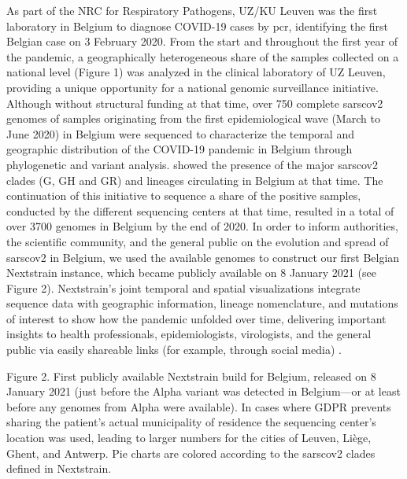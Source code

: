As part of the NRC for Respiratory Pathogens, UZ/KU Leuven was the first laboratory in Belgium to diagnose COVID-19 cases by \gls{pcr}, identifying the first Belgian case on 3 February 2020.
From the start and throughout the first year of the pandemic, a geographically heterogeneous share of the samples collected on a national level (Figure 1) was analyzed in the clinical laboratory of UZ Leuven, providing a unique opportunity for a national genomic surveillance initiative.
Although without structural funding at that time, over 750 complete \gls{sarscov2} genomes of samples originating from the first epidemiological wave (March to June 2020) in Belgium were sequenced to characterize the temporal and geographic distribution of the COVID-19 pandemic in Belgium through phylogenetic and variant analysis.
\citet{wawina-bokalanga2021genetic} showed the presence of the major \gls{sarscov2} clades (G, GH and GR) and lineages circulating in Belgium at that time.
The continuation of this initiative to sequence a share of the positive samples, conducted by the different sequencing centers at that time, resulted in a total of over 3700 genomes in Belgium by the end of 2020.
In order to inform authorities, the scientific community, and the general public on the evolution and spread of \gls{sarscov2} in Belgium, we used the available genomes to construct our first Belgian Nextstrain instance, which became publicly available on 8 January 2021 (see Figure 2).
Nextstrain's joint temporal and spatial visualizations integrate sequence data with geographic information, lineage nomenclature, and mutations of interest to show how the pandemic unfolded over time, delivering important insights to health professionals, epidemiologists, virologists, and the general public via easily shareable links (for example, through social media) \citep{hadfield2018nextstrain}.


Figure 2. First publicly available Nextstrain build for Belgium, released on 8 January 2021 (just before the Alpha variant was detected in Belgium—or at least before any genomes from Alpha were available).
In cases where GDPR prevents sharing the patient's actual municipality of residence the sequencing center's location was used, leading to larger numbers for the cities of Leuven, Li\`{e}ge, Ghent, and Antwerp.
Pie charts are colored according to the \gls{sarscov2} clades defined in Nextstrain.


